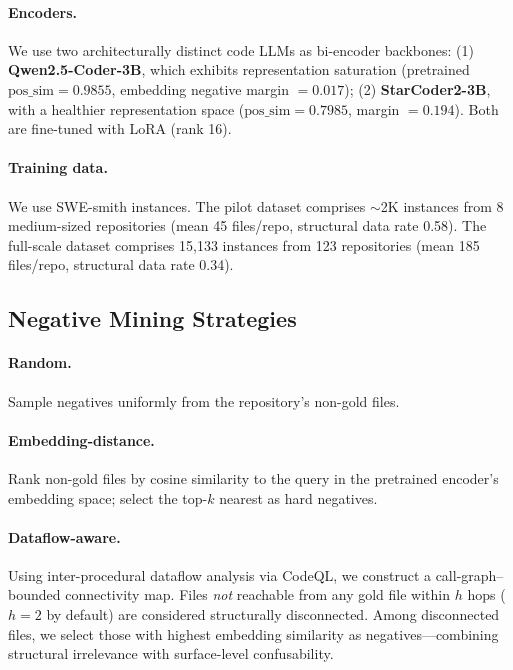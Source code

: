 \documentclass[11pt,a4paper]{article}
\begin{document}
\paragraph{Encoders.}
We use two architecturally distinct code LLMs as bi-encoder backbones:
(1) \textbf{Qwen2.5-Coder-3B}, which exhibits representation saturation (pretrained $\text{pos\_sim} = 0.9855$, embedding negative margin $= 0.017$);
(2) \textbf{StarCoder2-3B}, with a healthier representation space ($\text{pos\_sim} = 0.7985$, margin $= 0.194$).
Both are fine-tuned with LoRA (rank 16).

\paragraph{Training data.}
We use SWE-smith instances. The pilot dataset comprises ${\sim}$2K instances from 8 medium-sized repositories (mean 45 files/repo, structural data rate 0.58). The full-scale dataset comprises 15,133 instances from 123 repositories (mean 185 files/repo, structural data rate 0.34).

\subsection{Negative Mining Strategies}

\paragraph{Random.}
Sample negatives uniformly from the repository's non-gold files.

\paragraph{Embedding-distance.}
Rank non-gold files by cosine similarity to the query in the pretrained encoder's embedding space; select the top-$k$ nearest as hard negatives.

\paragraph{Dataflow-aware.}
Using inter-procedural dataflow analysis via CodeQL, we construct a call-graph--bounded connectivity map.
Files \emph{not} reachable from any gold file within $h$ hops ($h=2$ by default) are considered structurally disconnected.
Among disconnected files, we select those with highest embedding similarity as negatives---combining structural irrelevance with surface-level confusability.
\end{document}

